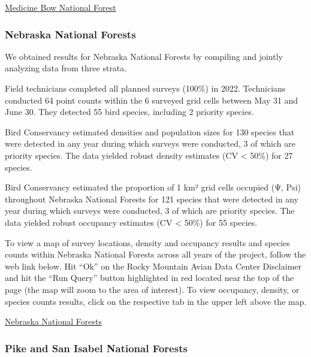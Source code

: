 \documentclass[
  letterpaper,
  DIV=11,
  numbers=noendperiod,
  oneside]{scrreprt}
\begin{document}
\href{http://www.rmbo.org/new_site/adc/QueryWindow.aspx\#N4IgzgrgDgpgTmALnAhoiBbEAuABCAWRgBMBLAY1IDsZcAhAewHdcA5NUhqlAG1wDEGcGEhABfIA}{Medicine
Bow National Forest}

\hypertarget{nebraska-national-forests}{%
\subsubsection{Nebraska National
Forests}\label{nebraska-national-forests}}

We obtained results for Nebraska National Forests by compiling and
jointly analyzing data from three strata.

Field technicians completed all planned surveys (100\%) in 2022.
Technicians conducted 64 point counts within the 6 surveyed grid cells
between May 31 and June 30. They detected 55 bird species, including 2
priority species.

Bird Conservancy estimated densities and population sizes for 130
species that were detected in any year during which surveys were
conducted, 3 of which are priority species. The data yielded robust
density estimates (CV \textless{} 50\%) for 27 species.

Bird Conservancy estimated the proportion of 1 km² grid cells occupied
(Ψ, Psi) throughout Nebraska National Forests for 121 species that were
detected in any year during which surveys were conducted, 3 of which are
priority species. The data yielded robust occupancy estimates (CV
\textless{} 50\%) for 55 species.

To view a map of survey locations, density and occupancy results and
species counts within Nebraska National Forests across all years of the
project, follow the web link below. Hit ``Ok'' on the Rocky Mountain
Avian Data Center Disclaimer and hit the ``Run Query'' button
highlighted in red located near the top of the page (the map will zoom
to the area of interest). To view occupancy, density, or species counts
results, click on the respective tab in the upper left above the map.

\href{http://www.rmbo.org/new_site/adc/QueryWindow.aspx\#N4IgzgrgDgpgTmALnAhoiBbEAuABCAORgCNUwBrFXAtASwHsA7FAG1wDF64YkwQBfIA=}{Nebraska
National Forests}

\hypertarget{pike-and-san-isabel-national-forests}{%
\subsubsection{Pike and San Isabel National
Forests}\label{pike-and-san-isabel-national-forests}}
\end{document}
